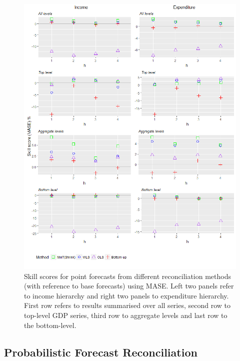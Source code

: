 \documentclass[graybox]{svmult}
\begin{document}
\begin{figure}[t]
	\centering
	\small
	\includegraphics[width=\textwidth]{Figs/Results/PointF_MASE.png}
	\caption{Skill scores for point forecasts from different reconciliation methods (with reference to base forecasts) using MASE. Left two panels refer to income hierarchy and right two panels to expenditure hierarchy. First row refers to results summarised over all series, second row to top-level GDP series, third row to aggregate levels and last row to the bottom-level.}
	\label{fig: PointF_MASE}
\end{figure}


\subsection{Probabilistic Forecast Reconciliation}
\end{document}
